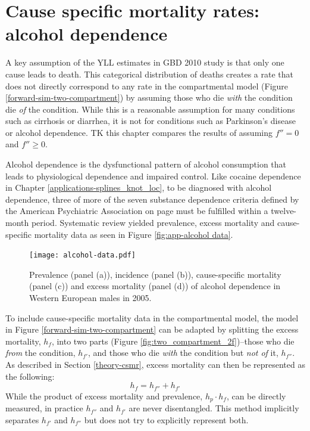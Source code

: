 \chapter{Cause specific mortality rates: alcohol dependence}
\label{applications-csmr}

A key assumption of the YLL estimates in GBD 2010 study is that only
one cause leads to death.  This categorical distribution of deaths
creates a rate that does not directly correspond to any rate in the
compartmental model (Figure \ref{forward-sim-two-compartment}) by
assuming those who die \emph{with} the condition die \emph{of} the
condition.  While this is a reasonable assumption for many conditions
such as cirrhosis or diarrhea, it is not for conditions such as
Parkinson's disease or alcohol dependence.  TK this chapter compares
the results of assuming $f''=0$ and $f''\geq 0$.

Alcohol dependence is the dysfunctional pattern of alcohol consumption
that leads to physiological dependence and impaired control.  Like
cocaine dependence in Chapter \ref{applications-splines_knot_loc}, to
be diagnosed with alcohol dependence, three of more of the seven
substance dependence criteria defined by the American Psychiatric
Association on page \pageref{page:app-substance_dependence} must be
fulfilled within a twelve-month period. \cite{association_diagnostic_2000, hasin_prevalence_2007}
Systematic review yielded prevalence, excess mortality and
cause-specific mortality data as seen in Figure \ref{fig:app-alcohol
  data}.

    \begin{figure}[h]
        \begin{center}
            \texttt{[image: alcohol-data.pdf]}
            \caption{Prevalence (panel (a)), incidence (panel (b)),
              cause-specific mortality (panel (c)) and excess
              mortality (panel (d)) of alcohol dependence in Western
              European males in 2005.}
            \label{fig:app-alcohol data}
        \end{center}
    \end{figure}

To include cause-specific mortality data in the compartmental model,
the model in Figure \ref{forward-sim-two-compartment} can be adapted
by splitting the excess mortality, $h_{f}$, into two parts (Figure
\ref{fig:two_compartment_2f})--those who die \emph{from} the
condition, $h_{f'}$, and those who die \emph{with} the condition but
\emph{not of} it, $h_{f''}$.  As described in Section
\ref{theory-csmr}, excess mortality can then be represented as the
following:
    \begin{equation}
        h_{f} = h_{f''} + h_{f'}
    \end{equation}
While the product of excess mortality and prevalence, $h_{p} \cdot h_{f}$,
can be directly measured, in practice $h_{f''}$ and $h_{f'}$ are never
disentangled.  This method implicitly separates $h_{f'}$ and $h_{f''}$
but does not try to explicitly represent both.

